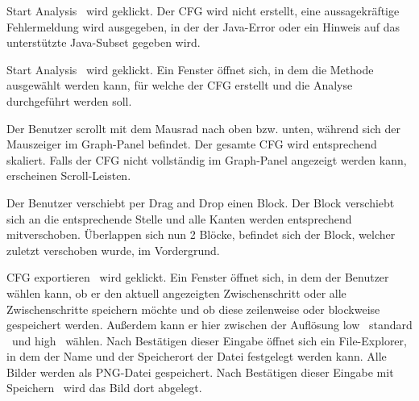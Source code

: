 {\glqq Start Analysis \grqq\ wird geklickt.}
{Der CFG wird nicht erstellt, eine aussagekräftige Fehlermeldung wird ausgegeben, in der der Java-Error oder ein Hinweis auf das unterstützte Java-Subset gegeben wird.}

{\glqq Start Analysis \grqq\ wird geklickt.}
{Ein Fenster öffnet sich, in dem die Methode ausgewählt werden kann, für welche der CFG erstellt und die Analyse durchgeführt werden soll.}



{Der Benutzer scrollt mit dem Mausrad nach oben bzw. unten, während sich der Mauszeiger im Graph-Panel befindet.}
{Der gesamte CFG wird entsprechend skaliert. Falls der CFG nicht vollständig im Graph-Panel angezeigt werden kann, erscheinen Scroll-Leisten.}

{Der Benutzer verschiebt per \glqq Drag and Drop \grqq einen Block.}
{Der Block verschiebt sich an die entsprechende Stelle und alle Kanten werden entsprechend mitverschoben. Überlappen sich nun 2 Blöcke, befindet sich der Block, welcher zuletzt verschoben wurde, im Vordergrund.}

\newpage


{\glqq CFG exportieren \grqq\ wird geklickt.}
{Ein Fenster öffnet sich, in dem der Benutzer wählen kann, ob er den aktuell angezeigten Zwischenschritt oder alle Zwischenschritte speichern möchte und ob diese zeilenweise oder blockweise gespeichert werden. Außerdem kann er hier zwischen der Auflösung \glqq low \grqq\, \glqq standard \grqq\ und  \glqq  high \grqq\ wählen. Nach Bestätigen dieser Eingabe öffnet sich ein File-Explorer, in dem der Name und der Speicherort der Datei festgelegt werden kann. Alle Bilder werden als PNG-Datei gespeichert. Nach Bestätigen dieser Eingabe mit  \glqq Speichern \grqq\ wird das Bild dort abgelegt.}


